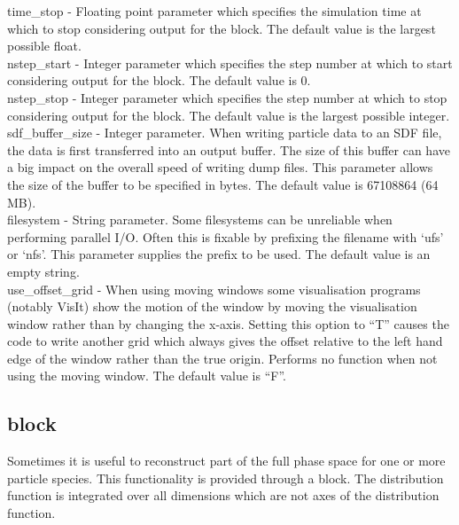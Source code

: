 {\emphtext time\_stop} - Floating point parameter which specifies the
  simulation time at which to stop considering output for the block.
  The default value is the largest possible float.\\

{\emphtext nstep\_start} - Integer parameter which specifies the
  step number at which to start considering output for the block.
  The default value is 0.\\

{\emphtext nstep\_stop} - Integer parameter which specifies the
  step number at which to stop considering output for the block.
  The default value is the largest possible integer.\\

{\emphtext sdf\_buffer\_size} - Integer parameter. When writing particle data
to an SDF file, the data is first transferred into an output buffer. The
size of this buffer can have a big impact on the overall speed of writing
dump files. This parameter allows the size of the buffer to be specified in
bytes. The default value is 67108864 (64 MB).\\

{\emphtext filesystem} - String parameter. Some filesystems can be unreliable
when performing parallel I/O. Often this is fixable by prefixing the filename
with `ufs' or `nfs'. This parameter supplies the prefix to be used. The
default value is an empty string.\\

{\emphtext use\_offset\_grid} - When using moving windows some visualisation
programs (notably VisIt) show the motion of the window by moving the
visualisation window rather than by changing the x-axis. Setting this option to
``T'' causes the code to write another grid which always gives the offset
relative to the left hand edge of the window rather than the true origin.
Performs no function when not using the moving window. The default value
is ``F''.\\

\subsection{ block}
\label{sec:dist_fn_block}

Sometimes it is useful to reconstruct part of the
full phase space for one or more particle species.
This functionality is provided through a  block. The
distribution function is integrated over all dimensions which are not axes of
the distribution function.

